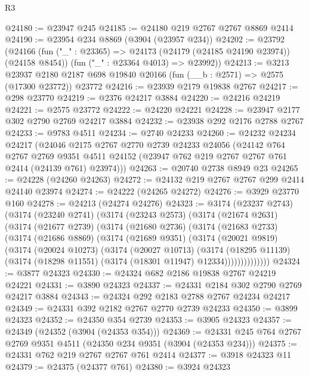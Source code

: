 \begin{lexlean}{R3}
\begin{coremodule}
@24180 := @23947 @245
@24185 := @24180 @219 @2767 @2767 @8869 @2414
@24190 := @23954 @234 @8869 (@3904 (@23957 @234))
@24202 := @23792
    (@24166
      (fun ("_" : @23365) => @24173 (@24179 (@24185 @24190 @23974)) (@24158 @8454))
      (fun ("_" : @23364 @4013) => @23992))
@24213 := @3213
    @23937
    @2180
    @2187
    @698
    @19840
    @20166
    (fun (__b : @2571) => @2575 (@17300 @23772))
    @23772
@24216 := @23939 @2179 @19838 @2767
@24217 := @298 @23770
@24219 := @2376 @24217 @3884
@24220 := @24216 @24219
@24221 := @2575 @23772
@24222 := @24220 @24221
@24228 := @23947 @2177 @302 @2790 @2769 @24217 @3884
@24232 := @23938 @292 @2176 @2788 @2767
@24233 := @9783 @4511
@24234 := @2740 @24233
@24260 := @24232
    @24234
    @24217
    (@24046
      @2175
      @2767
      @2770
      @2739
      @24233
      @24056
      (@24142
        @764
        @2767
        @2769
        @9351
        @4511
        @24152
        (@23947 @762 @219 @2767 @2767 @761 @2414 (@24139 @761) @23974)))
@24263 := @20740 @2738 @8949 @23
@24265 := @24228 (@24260 @24263)
@24272 := @24132 @219 @2767 @2767 @299 @2414 @24140 @23974
@24274 := @24222 (@24265 @24272)
@24276 := @3929 @23770 @160
@24278 := @24213 (@24274 @24276)
@24323 := @3174
    (@23237 @2743)
    (@3174
      (@23240 @2741)
      (@3174
        (@23243 @2573)
        (@3174
          (@21674 @2631)
          (@3174
            (@21677 @2739)
            (@3174
              (@21680 @2736)
              (@3174
                (@21683 @2733)
                (@3174
                  (@21686 @8869)
                  (@3174
                    (@21689 @9351)
                    (@3174
                      (@20021 @9819)
                      (@3174
                        (@20024 @10273)
                        (@3174
                          (@20027 @10713)
                          (@3174
                            (@18295 @11139)
                            (@3174 (@18298 @11551) (@3174 (@18301 @11947) @12334))))))))))))))
@24324 := @3877 @24323
@24330 := @24324 @682 @2186 @19838 @2767 @24219 @24221
@24331 := @3890 @24323
@24337 := @24331 @2184 @302 @2790 @2769 @24217 @3884
@24343 := @24324 @292 @2183 @2788 @2767 @24234 @24217
@24349 := @24331 @392 @2182 @2767 @2770 @2739 @24233
@24350 := @3899 @24323
@24352 := @24350 @354 @2739
@24353 := @3905 @24323
@24357 := @24349 (@24352 (@3904 (@24353 @354)))
@24369 := @24331 @245 @764 @2767 @2769 @9351 @4511 (@24350 @234 @9351 (@3904 (@24353 @234)))
@24375 := @24331 @762 @219 @2767 @2767 @761 @2414
@24377 := @3918 @24323 @11
@24379 := @24375 (@24377 @761)
@24380 := @3924 @24323

\end{coremodule}
\end{lexlean}
